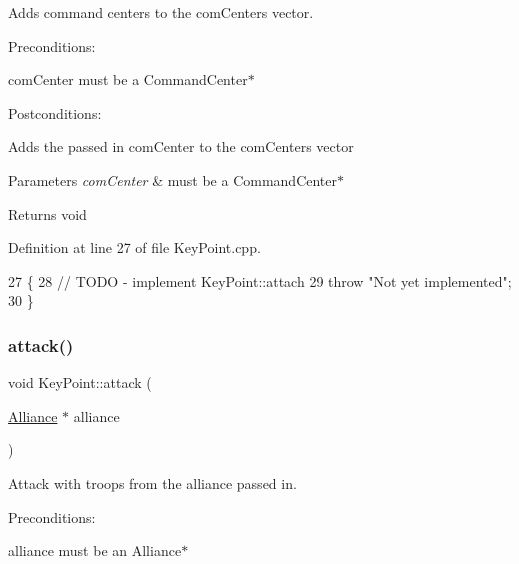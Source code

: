 Adds command centers to the com\+Centers vector. 

Preconditions\+:
\begin{DoxyItemize}
\item com\+Center must be a Command\+Center$\ast$
\end{DoxyItemize}

Postconditions\+:
\begin{DoxyItemize}
\item Adds the passed in com\+Center to the com\+Centers vector
\end{DoxyItemize}


\begin{DoxyParams}{Parameters}
{\em com\+Center} & must be a Command\+Center$\ast$ \\
\hline
\end{DoxyParams}
\begin{DoxyReturn}{Returns}
void 
\end{DoxyReturn}


Definition at line 27 of file Key\+Point.\+cpp.


\begin{DoxyCode}
27                                               \{
28     \textcolor{comment}{// TODO - implement KeyPoint::attach}
29     \textcolor{keywordflow}{throw} \textcolor{stringliteral}{"Not yet implemented"};
30 \}
\end{DoxyCode}
\mbox{\label{classKeyPoint_a137026380d2907f880bb4c48b30c2d5e}} 
\subsubsection{\texorpdfstring{attack()}{attack()}}
{\footnotesize\ttfamily void Key\+Point\+::attack (\begin{DoxyParamCaption}\item[{\hyperlink{classAlliance}{Alliance} $\ast$}]{alliance }\end{DoxyParamCaption})\hspace{0.3cm}{\ttfamily [virtual]}}



Attack with troops from the alliance passed in. 

Preconditions\+:
\begin{DoxyItemize}
\item alliance must be an Alliance$\ast$
\end{DoxyItemize}

